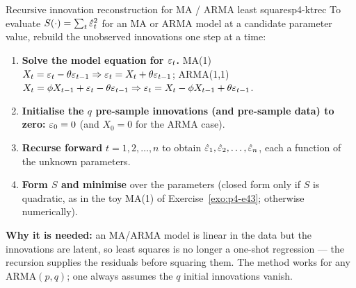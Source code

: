 \begin{keytech}{Recursive innovation reconstruction for MA / ARMA least squares}{p4-ktrec}
To evaluate $S(\cdot)=\sum_t\hat{\varepsilon}_t^2$ for an MA or ARMA model at a candidate
parameter value, rebuild the unobserved innovations one step at a time:
\begin{enumerate}
  \item \textbf{Solve the model equation for $\varepsilon_t$.}
        MA(1) $X_t=\varepsilon_t-\theta\varepsilon_{t-1}\Rightarrow\varepsilon_t=X_t+\theta\varepsilon_{t-1}$;
        ARMA(1,1) $X_t=\phi X_{t-1}+\varepsilon_t-\theta\varepsilon_{t-1}
        \Rightarrow\varepsilon_t=X_t-\phi X_{t-1}+\theta\varepsilon_{t-1}$.
  \item \textbf{Initialise the $q$ pre-sample innovations (and pre-sample data)
        to zero:} $\varepsilon_0=0$ (and $X_0=0$ for the ARMA case).
  \item \textbf{Recurse forward} $t=1,2,\dots,n$ to obtain
        $\hat{\varepsilon}_1,\hat{\varepsilon}_2,\dots,\hat{\varepsilon}_n$, each a function of the unknown
        parameters.
  \item \textbf{Form $S$ and minimise} over the parameters (closed form only if
        $S$ is quadratic, as in the toy MA(1) of
        Exercise~\ref{exo:p4-e43}; otherwise numerically).
\end{enumerate}
\textbf{Why it is needed:} an MA/ARMA model is linear in the data but the
innovations are latent, so least squares is no longer a one-shot regression ---
the recursion supplies the residuals before squaring them. The method works for
any ARMA$(p,q)$; one always assumes the $q$ initial innovations vanish.
\end{keytech}

